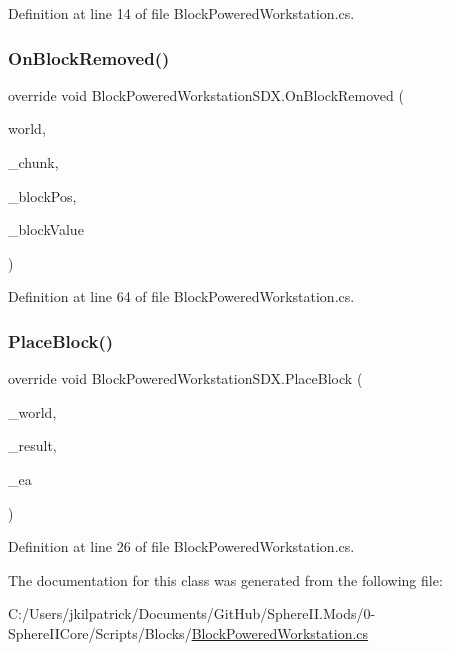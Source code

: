 Definition at line 14 of file Block\+Powered\+Workstation.\+cs.

\mbox{\label{class_block_powered_workstation_s_d_x_aba18512171241067d4337d684d56b556}} 
\subsubsection{\texorpdfstring{OnBlockRemoved()}{OnBlockRemoved()}}
{\footnotesize\ttfamily override void Block\+Powered\+Workstation\+S\+D\+X.\+On\+Block\+Removed (\begin{DoxyParamCaption}\item[{World\+Base}]{world,  }\item[{Chunk}]{\+\_\+chunk,  }\item[{Vector3i}]{\+\_\+block\+Pos,  }\item[{Block\+Value}]{\+\_\+block\+Value }\end{DoxyParamCaption})}



Definition at line 64 of file Block\+Powered\+Workstation.\+cs.

\mbox{\label{class_block_powered_workstation_s_d_x_ab4cdc00b9a432a250cc3e733286c41cd}} 
\subsubsection{\texorpdfstring{PlaceBlock()}{PlaceBlock()}}
{\footnotesize\ttfamily override void Block\+Powered\+Workstation\+S\+D\+X.\+Place\+Block (\begin{DoxyParamCaption}\item[{World\+Base}]{\+\_\+world,  }\item[{Block\+Placement.\+Result}]{\+\_\+result,  }\item[{Entity\+Alive}]{\+\_\+ea }\end{DoxyParamCaption})}



Definition at line 26 of file Block\+Powered\+Workstation.\+cs.



The documentation for this class was generated from the following file\+:\begin{DoxyCompactItemize}
\item 
C\+:/\+Users/jkilpatrick/\+Documents/\+Git\+Hub/\+Sphere\+I\+I.\+Mods/0-\/\+Sphere\+I\+I\+Core/\+Scripts/\+Blocks/\mbox{\hyperlink{_block_powered_workstation_8cs}{Block\+Powered\+Workstation.\+cs}}\end{DoxyCompactItemize}
